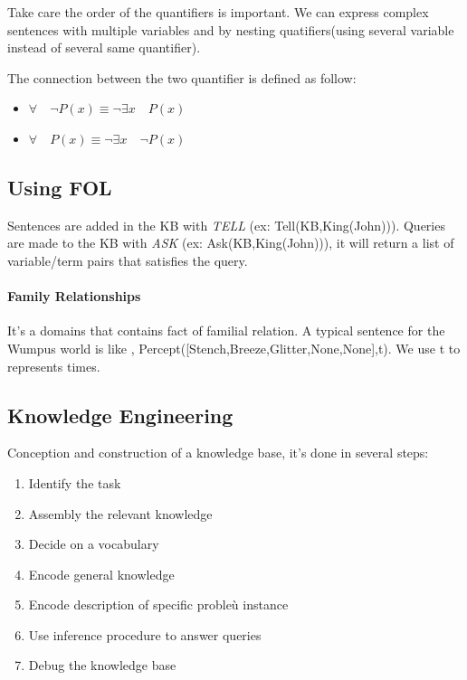  Take  care  the  order  of  the  quantifiers is  important.  We  can
 express  complex  sentences  with  multiple variables  and  by  nesting
 quatifiers(using several variable instead of several same quantifier).

 The  connection  between  the  two quantifier  is  defined  as  follow:
 \begin{itemize}  \item $\forall\quad  \neg  P(x)  \equiv \neg\exists  x
 \quad P(x) $  \item $\forall\quad P(x) \equiv \neg\exists  x \quad \neg
 P(x)$ \end{itemize}

\subsection{Using FOL}

 Sentences   are    added   in   the   KB    with   \textit{TELL}   (ex:
 Tell(KB,King(John))). Queries are made to the KB with \textit{ASK} (ex:
 Ask(KB,King(John))), it will return a  list of variable/term pairs that
 satisfies the query.

 \paragraph{Family Relationships}  It's a domains that  contains fact of
 familial relation.  A typical sentence for  the Wumpus world is  like ,
 Percept([Stench,Breeze,Glitter,None,None],t).  We use  t to  represents
 times.

\subsection{Knowledge Engineering}

	Conception and construction of a knowledge base, it's done in several steps:
	\begin{multicols}{2}
		\begin{enumerate}
			\item Identify the task
			\item Assembly the relevant knowledge
			\item Decide on a vocabulary
			\item Encode general knowledge
			\item Encode description of specific probleù instance
			\item Use inference procedure to answer queries
			\item Debug the knowledge base
		\end{enumerate}
	\end{multicols}

